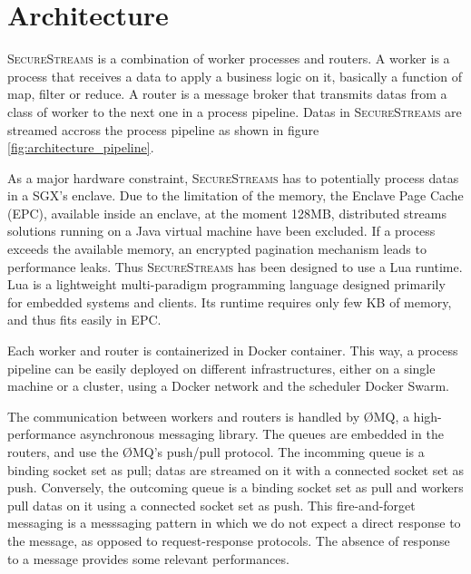 \section{Architecture}
\label{sec:architecture}


\textsc{SecureStreams} is a combination of worker processes and routers.
A worker is a process that receives a data to apply a business logic on it, basically a function of map, filter or reduce.
A router is a message broker that transmits datas from a class of worker to the next one in a process pipeline.
Datas in \textsc{SecureStreams} are streamed accross the process pipeline as shown in figure \ref{fig:architecture_pipeline}.

As a major hardware constraint, \textsc{SecureStreams} has to potentially process datas in a SGX's enclave.
Due to the limitation of the memory, the Enclave Page Cache (EPC), available inside an enclave, at the moment 128MB, distributed streams solutions running on a Java virtual machine have been excluded.
If a process exceeds the available memory, an encrypted pagination mechanism leads to performance leaks.
Thus \textsc{SecureStreams} has been designed to use a Lua runtime.
Lua is a lightweight multi-paradigm programming language designed primarily for embedded systems and clients\cite{ierusalimschy_luaextensible_1996}.
Its runtime requires only few KB of memory, and thus fits easily in EPC.

Each worker and router is containerized in Docker container.
This way, a process pipeline can be easily deployed on different infrastructures, either on a single machine or a cluster, using a Docker network and the scheduler Docker Swarm\cite{docker:swarm_2016}.

The communication between workers and routers is handled by ØMQ, a high-performance asynchronous messaging library\cite{zero_mq}.
The queues are embedded in the routers, and use the ØMQ's push/pull protocol.
The incomming queue is a binding socket set as pull; datas are streamed on it with a connected socket set as push.
Conversely, the outcoming queue is a binding socket set as pull and workers pull datas on it using a connected socket set as push.
This fire-and-forget messaging is a messsaging pattern in which we do not expect a direct response to the message, as opposed to request-response protocols\cite{voelter_patterns_2003}.
The absence of response to a message provides some relevant performances.

